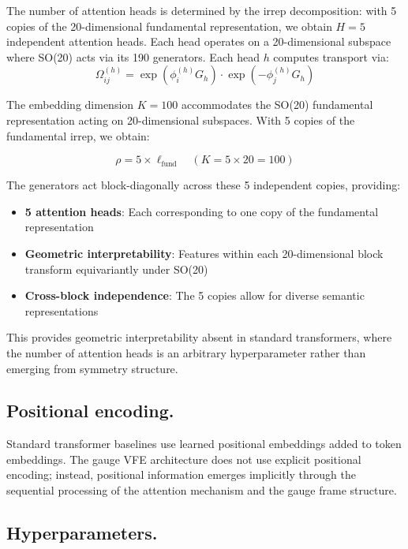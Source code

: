 \documentclass[twoside,11pt]{article}
\begin{document}
The number of attention heads is determined by the irrep decomposition: with 5 copies of the 20-dimensional fundamental representation, we obtain $H = 5$ independent attention heads. Each head operates on a 20-dimensional subspace where SO(20) acts via its 190 generators. Each head $h$ computes transport via:
\begin{equation}
\Omega_{ij}^{(h)} = \exp(\phi_i^{(h)} G_h) \cdot \exp(-\phi_j^{(h)} G_h)
\end{equation}

The embedding dimension $K = 100$ accommodates the SO(20) fundamental representation acting on 20-dimensional subspaces. With 5 copies of the fundamental irrep, we obtain:

\begin{equation}
\rho = 5 \times \ell_{\text{fund}} \quad (K = 5 \times 20 = 100)
\end{equation}

The generators act block-diagonally across these 5 independent copies, providing:

\begin{itemize}
\item \textbf{5 attention heads}: Each corresponding to one copy of the fundamental representation
\item \textbf{Geometric interpretability}: Features within each 20-dimensional block transform equivariantly under SO(20)
\item \textbf{Cross-block independence}: The 5 copies allow for diverse semantic representations
\end{itemize}

This provides geometric interpretability absent in standard transformers, where the number of attention heads is an arbitrary hyperparameter rather than emerging from symmetry structure.

\subsection{Positional encoding.}

Standard transformer baselines use learned positional embeddings added to token embeddings. The gauge VFE architecture does not use explicit positional encoding; instead, positional information emerges implicitly through the sequential processing of the attention mechanism and the gauge frame structure.

\subsection{Hyperparameters.}
\end{document}
